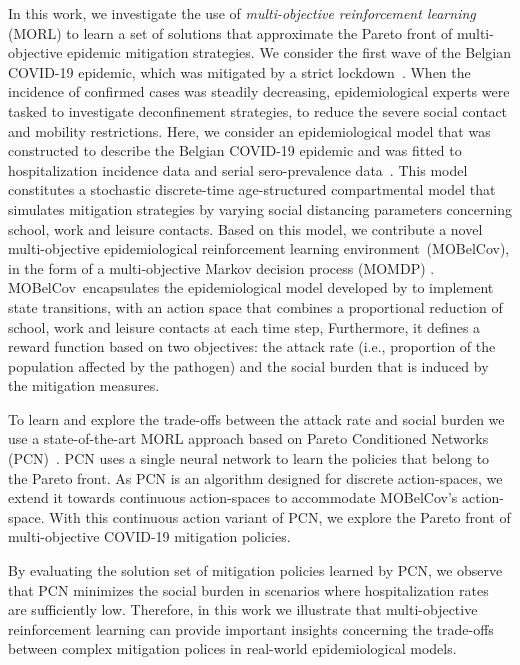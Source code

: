 \documentclass{article}
\renewcommand{\cite}[1]{\citep{#1}}
\newcommand{\momdpname}{MOBelCov}
\begin{document}
In this work, we investigate the use of \emph{multi-objective reinforcement learning} (MORL) to learn a set of solutions that approximate the Pareto front of multi-objective epidemic mitigation strategies. We consider the first wave of the Belgian COVID-19 epidemic, which was mitigated by a strict lockdown~\cite{willem2021impact}. When the incidence of confirmed cases was steadily decreasing, epidemiological experts were tasked to investigate deconfinement strategies, to reduce the severe social contact and mobility restrictions.
Here, we consider an epidemiological model that was constructed to describe the Belgian COVID-19 epidemic and was fitted to hospitalization incidence data and serial sero-prevalence data~\cite{abrams2021modelling}.
This model constitutes a stochastic discrete-time age-structured compartmental model that simulates mitigation strategies by varying social distancing parameters concerning school, work and leisure contacts.  
Based on this model, we contribute a novel multi-objective epidemiological reinforcement learning environment~(\momdpname), in the form of a multi-objective Markov decision process (MOMDP) \cite{roijers2013survey}. \momdpname\ encapsulates the epidemiological model developed by \citet{abrams2021modelling} to implement state transitions, with an action space that combines a proportional reduction of school, work and leisure contacts at each time step, Furthermore, it defines a reward function based on two objectives: the attack rate (i.e., proportion of the population affected by the pathogen) and the social burden that is induced by the mitigation measures.

To learn and explore the trade-offs between the attack rate and social burden we use a state-of-the-art MORL approach based on Pareto Conditioned Networks (PCN)~\cite{reymond2022pcn}. PCN uses a single neural network to learn the policies that belong to the Pareto front.
As PCN is an algorithm designed for discrete action-spaces, we extend it towards continuous action-spaces to accommodate \momdpname's action-space. With this continuous action variant of PCN, we explore the Pareto front of multi-objective COVID-19 mitigation policies.  

By evaluating the solution set of mitigation policies learned by PCN, we observe that PCN minimizes the social burden in scenarios where hospitalization rates are sufficiently low. Therefore, in this work we illustrate that multi-objective reinforcement learning can provide important insights concerning the trade-offs between complex mitigation polices in real-world epidemiological models.
\end{document}
